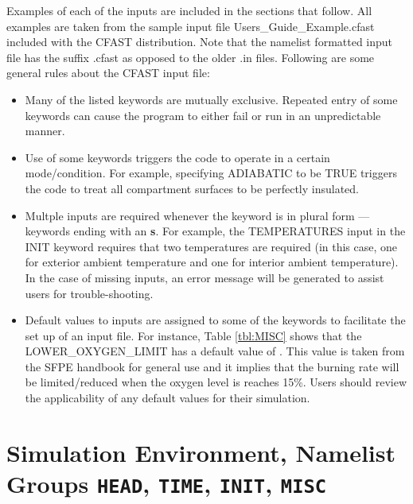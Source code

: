 Examples of each of the inputs are included in the sections that follow.  All examples are taken from the sample input file {\ct Users\_Guide\_Example.cfast} included with the CFAST distribution. Note that the namelist formatted input file has the suffix {\ct .cfast} as opposed to the older {\ct .in} files. Following are some general rules about the CFAST input file:
\begin{itemize}
\item Many of the listed keywords are mutually exclusive. Repeated entry of some keywords can cause the program to either fail or run in an unpredictable manner.
\item Use of some keywords triggers the code to operate in a certain mode/condition. For example, specifying {\ct ADIABATIC} to be {\ct TRUE} triggers the code to treat all compartment surfaces to be perfectly insulated.
\item Multple inputs are required whenever the keyword is in plural form --- keywords ending with an \textbf{s}. For example, the {\ct TEMPERATURES} input in the {\ct INIT} keyword requires that two temperatures are required (in this case, one for exterior ambient temperature and one for interior ambient temperature). In the case of missing inputs, an error message will be generated to assist users for trouble-shooting.
\item Default values to inputs are assigned to some of the keywords to facilitate the set up of an input file. For instance, Table \ref{tbl:MISC} shows that the {\ct LOWER\_OXYGEN\_LIMIT} has a default value of {}. This value is taken from the SFPE handbook \cite{SFPE:2003} for general use and it implies that the burning rate will be limited/reduced when the oxygen level is reaches 15\%. Users should review the applicability of any default values for their simulation.
\end{itemize}


\clearpage

\section{Simulation Environment, Namelist Groups \texorpdfstring{{\tt HEAD}}{HEAD}, \texorpdfstring{{\tt TIME}}{TIME}, \texorpdfstring{{\tt INIT}}{INIT}, \texorpdfstring{{\tt MISC}}{MISC}}


